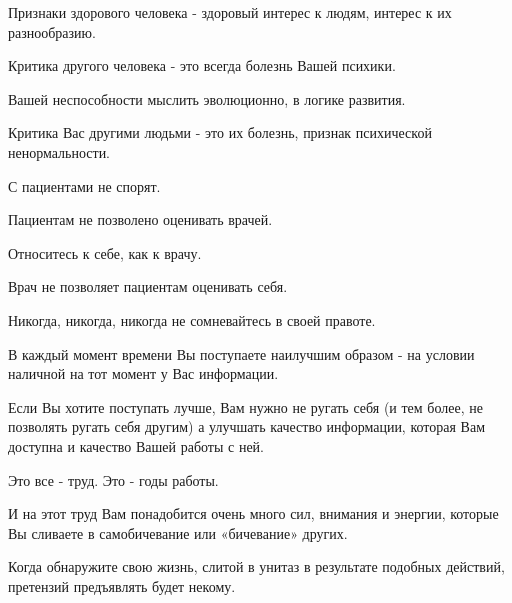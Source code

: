 Признаки здорового человека - здоровый интерес к людям, интерес к их
разнообразию.

Критика другого человека - это всегда болезнь Вашей психики. 

Вашей неспособности мыслить эволюционно, в логике развития. 

Критика Вас другими людьми - это их болезнь, признак психической
ненормальности. 

С пациентами не спорят. 

Пациентам не позволено оценивать врачей.

Относитесь к себе, как к врачу.

Врач не позволяет пациентам оценивать себя.

Никогда, никогда, никогда не сомневайтесь в своей правоте.

В каждый момент времени Вы поступаете наилучшим образом - на условии наличной
на тот момент у Вас информации.

Если Вы хотите поступать лучше, Вам нужно не ругать себя (и тем более, не
позволять ругать себя другим) а улучшать качество информации, которая Вам
доступна и качество Вашей работы с ней.

Это все - труд. Это - годы работы.

И на этот труд Вам понадобится очень много сил, внимания и энергии, которые Вы
сливаете в самобичевание или «бичевание» других.

Когда обнаружите свою жизнь, слитой в унитаз в результате подобных действий,
претензий предъявлять будет некому.
